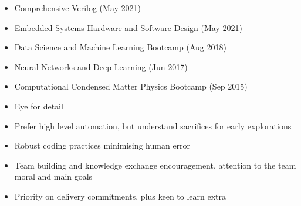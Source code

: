\documentclass[10pt,a4paper,ragged2e,withhyper]{altacv}
\begin{document}
\begin{paracol}{2}
\begin{itemize}
    \item Comprehensive Verilog (May 2021)
    
    \item Embedded Systems Hardware and Software Design (May 2021)
    
    \item Data Science and Machine Learning Bootcamp (Aug 2018)
    
    \item Neural Networks and Deep Learning (Jun 2017)
    
    \item Computational Condensed Matter Physics Bootcamp (Sep 2015)
\end{itemize}



\begin{itemize}
    \item Eye for detail
    
    \item Prefer high level automation, but understand sacrifices for
    early explorations
    
    \item Robust coding practices minimising human error
    
    \item Team building and knowledge exchange encouragement,
    attention to the team moral and main goals
    
    \item Priority on delivery commitments, plus keen to learn extra
\end{itemize}



\end{paracol}
\end{document}

